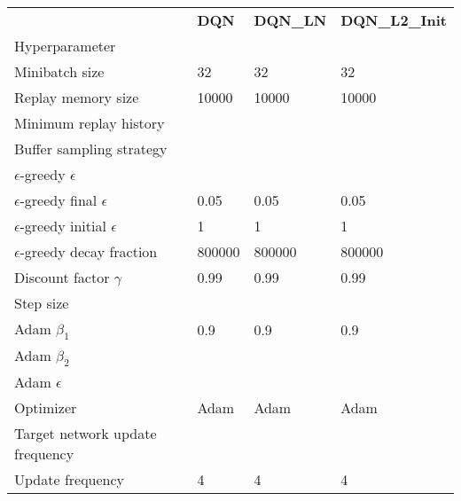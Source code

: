 \begin{tabular}{llll}
 & \bfseries DQN & \bfseries DQN_LN & \bfseries DQN_L2_Init \\
Hyperparameter &  &  &  \\
Minibatch size & 32 & 32 & 32 \\
Replay memory size & 10000 & 10000 & 10000 \\
Minimum replay history &  &  &  \\
Buffer sampling strategy &  &  &  \\
$\epsilon$-greedy $\epsilon$ &  &  &  \\
$\epsilon$-greedy final $\epsilon$ & 0.05 & 0.05 & 0.05 \\
$\epsilon$-greedy initial $\epsilon$ & 1 & 1 & 1 \\
$\epsilon$-greedy decay fraction & 800000 & 800000 & 800000 \\
Discount factor $\gamma$ & 0.99 & 0.99 & 0.99 \\
Step size &  &  &  \\
Adam $\beta_1$ & 0.9 & 0.9 & 0.9 \\
Adam $\beta_2$ &  &  &  \\
Adam $\epsilon$ &  &  &  \\
Optimizer & Adam & Adam & Adam \\
Target network update frequency &  &  &  \\
Update frequency & 4 & 4 & 4 \\
\end{tabular}
